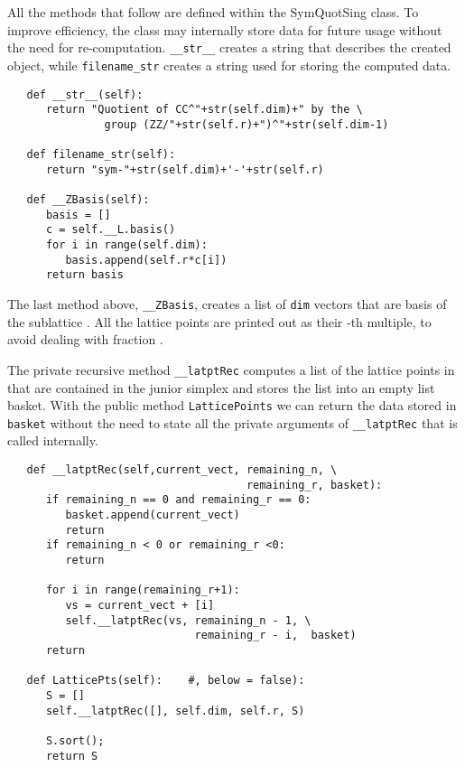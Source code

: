 \vspace{5pt}

\noindent All the methods that follow are defined within the SymQuotSing class. To improve efficiency, the class may internally store data for future usage without the need for re-computation. \texttt{\_\_str\_\_} creates a string that describes the created object, while \texttt{filename\_str} creates a string used for storing the computed data. 

\singlespacing
\begin{verbatim}
   def __str__(self):
      return "Quotient of CC^"+str(self.dim)+" by the \ 
               group (ZZ/"+str(self.r)+")^"+str(self.dim-1)

   def filename_str(self):
      return "sym-"+str(self.dim)+'-'+str(self.r)

   def __ZBasis(self):
      basis = []
      c = self.__L.basis()
      for i in range(self.dim):
         basis.append(self.r*c[i])
      return basis
\end{verbatim}

\vspace{5pt}

\noindent The last method above, \texttt{\_\_ZBasis}, creates a list of \texttt{dim} vectors that are basis of the sublattice . All the lattice points are printed out as their -th multiple, to avoid dealing with fraction .

\vspace{5pt}

The private recursive method \texttt{\_\_latptRec} computes a list of the lattice points in 
that are contained in the junior simplex and stores the list into an empty list basket. With the public method \texttt{LatticePoints} we can return the data stored in \texttt{basket} without the need to state all the private arguments of \texttt{\_\_latptRec} that is called internally.

\singlespacing
\begin{verbatim}
   def __latptRec(self,current_vect, remaining_n, \
                                     remaining_r, basket):
      if remaining_n == 0 and remaining_r == 0:
         basket.append(current_vect)
         return
      if remaining_n < 0 or remaining_r <0:
         return

      for i in range(remaining_r+1):
         vs = current_vect + [i]
         self.__latptRec(vs, remaining_n - 1, \
                             remaining_r - i,  basket)
      return

   def LatticePts(self):    #, below = false):
      S = []
      self.__latptRec([], self.dim, self.r, S)
      
      S.sort(); 
      return S
\end{verbatim}

